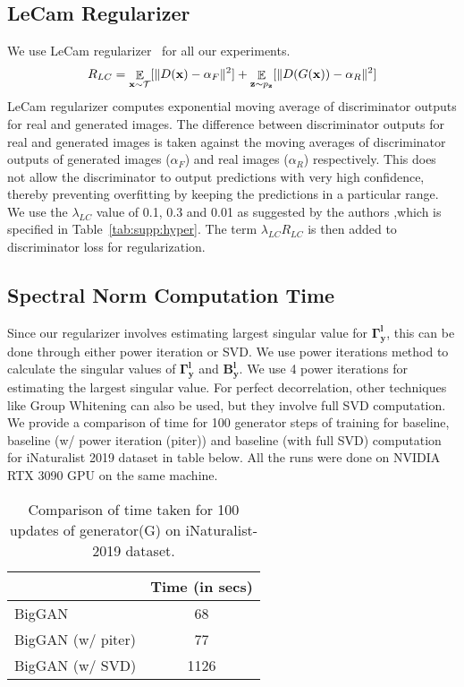 \documentclass[runningheads,table]{llncs}
\begin{document}
\subsection{LeCam Regularizer}
\label{subsec:supp:lecam}
We use LeCam regularizer~\cite{tseng2021regularizing} for all our experiments.
{\small
\begin{align}
R_{LC} = \mathop{\mathbb{E}}_{\mathbf{x}\sim\mathcal{T}}[\Vert D(\mathbf{x})-\alpha_F\Vert^2] + \mathop{\mathbb{E}}_{\mathbf{z}\sim p_{\mathbf{z}}}[\Vert D(G(\mathbf{x}))-\alpha_R\Vert^2]
\label{eq:lc_reg}
\vspace{-1mm}
\end{align}
}
\noindent \vspace{1mm} LeCam regularizer computes exponential moving average of discriminator outputs for real and generated images. The difference between discriminator outputs for real and generated images is taken against the moving averages of discriminator outputs of generated images ($\alpha_F$) and real images ($\alpha_R$) respectively. This does not allow the discriminator to output predictions with very high confidence, thereby preventing overfitting by keeping the predictions in a particular range. We use the $\lambda_{LC}$ value of 0.1, 0.3 and 0.01 as suggested by the authors \cite{tseng2021regularizing} ,which is specified in Table~\ref{tab:supp:hyper}. The term $\lambda_{LC}R_{LC}$ is then added to discriminator loss for regularization.

\subsection{Spectral Norm Computation Time}
\label{subsec:supp:comp}
Since our regularizer involves estimating largest singular value for $\mathbf{{\Gamma}_y^l}$, this can be done through either power iteration or SVD. We use power iterations method to calculate the singular values of $\mathbf{\Gamma^l_y}$ and $\mathbf{B^l_y}$. We use 4 power iterations for estimating the largest singular value. For perfect decorrelation, other techniques like Group Whitening \cite{huang2021group} can also be used, but they involve full SVD computation. We provide a comparison of time for 100 generator steps of training for baseline, baseline (w/ power iteration (piter)) and baseline (with full SVD) computation for iNaturalist 2019 dataset in table below. All the runs were done on NVIDIA RTX 3090 GPU on the same machine.  
\vspace{2mm}

\begin{table}[h]
\centering
\begin{tabular}{l|c}
\toprule
                  & Time (in secs) \\ \midrule
BigGAN            & 68             \\ 
BigGAN (w/ piter) & 77             \\ 
BigGAN (w/ SVD)   & 1126         \\ \bottomrule
\end{tabular}
\caption{Comparison of time taken for 100 updates of generator(G) on iNaturalist-2019 dataset. }
\label{tab:supp:time_comp}
\end{table}
\end{document}
